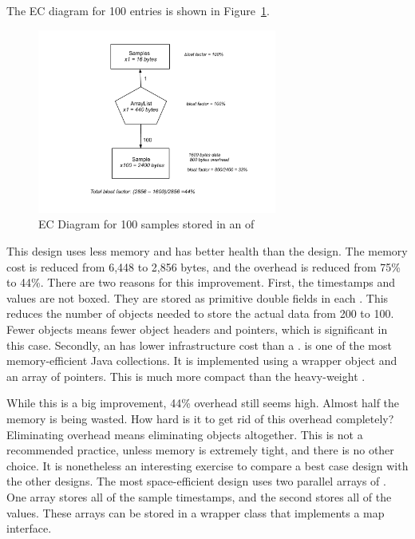 The EC diagram for 100 entries is shown in Figure~\ref{fig:content-schematic-arraylist-pairs}.
\begin{figure}
  \centering
 \includegraphics[width=0.7\textwidth]{part1/Figures/memoryhealth/arraylist-doubles}
  \caption{EC Diagram for 100 samples stored in an  of }
  \label{fig:content-schematic-arraylist-pairs}
\end{figure} 
This design uses less memory and has better health than the 
design. The memory cost is reduced from 6,448 to 2,856 bytes, and the overhead
is reduced from 75\% to 44\%.  There are two reasons for this improvement.
First, the timestamps and values are not boxed. They are stored as primitive
double fields in each . This reduces the number of objects needed
to store the actual data from 200 to 100. Fewer objects means fewer object
headers and pointers, which is significant in this case. Secondly, an
 has lower infrastructure cost than a .
 is one of the most memory-efficient Java collections. It is
implemented using a wrapper object and an array of pointers. This is much more
compact than the heavy-weight .

While this is a big improvement, 44\% overhead still seems high. Almost half the
memory is being wasted. How hard is it to get rid of this overhead completely?
Eliminating overhead means eliminating objects altogether. This is not a
recommended practice, unless memory is extremely tight, and there is no other
choice. It is nonetheless an interesting exercise to compare a best case
design with the other designs. The most space-efficient design uses two parallel
arrays of . One array stores all of the sample timestamps, and the
second stores all of the values. These arrays can be stored in a wrapper class that
implements a map interface.

